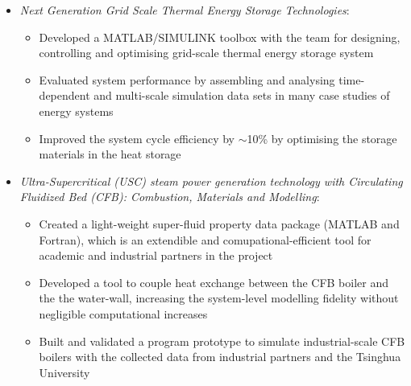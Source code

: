 \documentclass[letterpaper]{article}
\begin{document}
\begin{itemize}
		\begin{itemize}
		\item \textsl{	Next Generation Grid Scale Thermal Energy Storage Technologies}: 
					\begin{itemize}
					\item Developed a MATLAB/SIMULINK toolbox with the team for designing, controlling and optimising grid-scale thermal energy storage system%
					\item Evaluated system performance by assembling and analysing time-dependent and multi-scale simulation data sets in many case studies of energy systems
					\item Improved the system cycle efficiency by $\sim$10\% by optimising the storage materials in the heat storage
					\end{itemize}

		\item	\textsl{Ultra-Supercritical (USC) steam power generation technology with Circulating Fluidized Bed (CFB): Combustion, Materials and Modelling}: 
					\begin{itemize}
					\item Created a light-weight super-fluid property data package (MATLAB and Fortran), which is an extendible and comupational-efficient tool for academic and industrial partners in the project
					\item Developed a tool to couple heat exchange between the CFB boiler and the the water-wall, increasing the system-level modelling fidelity without negligible computational increases
					\item Built and validated a program prototype to simulate industrial-scale CFB boilers with the collected data from industrial partners and the Tsinghua University 
					\end{itemize}
		\end{itemize}


\end{itemize}
\end{document}

